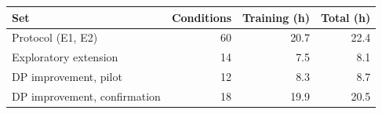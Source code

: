 \begin{tabular}{lrrr}
\toprule
Set & Conditions & Training (h) & Total (h) \\
\midrule
Protocol (E1, E2) & 60 & 20.7 & 22.4 \\
Exploratory extension & 14 & 7.5 & 8.1 \\
DP improvement, pilot & 12 & 8.3 & 8.7 \\
DP improvement, confirmation & 18 & 19.9 & 20.5 \\
\bottomrule
\end{tabular}
